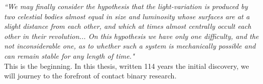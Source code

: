 \documentclass[12pt]{article} %
\numberwithin{equation}{section} %
\begin{document}
\emph{``We may finally consider the hypothesis that the light-variation is produced by two celestial bodies almost equal in size and luminosity whose surfaces are at a slight distance from each other, and which at times almost centrally occult each other in their revolution... On this hypothesis we have only one difficulty, and the not inconsiderable one, as to whether such a system is mechanically possible and can remain stable for any length of time."} \\

This is the beginning. In this thesis, written 114 years the initial discovery, we will journey to the forefront of contact binary research.









\end{document}
